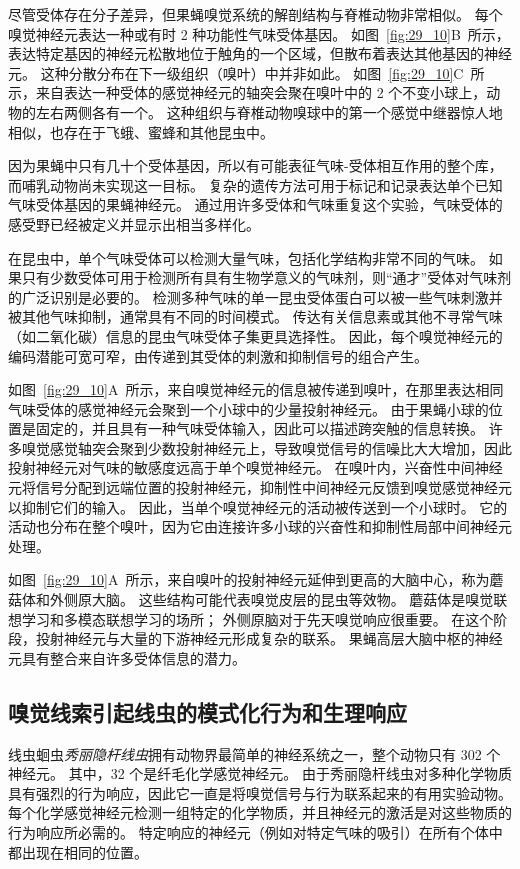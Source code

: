 尽管受体存在分子差异，但果蝇嗅觉系统的解剖结构与脊椎动物非常相似。
每个嗅觉神经元表达一种或有时 2 种功能性气味受体基因。
如图~\ref{fig:29_10}B~所示，表达特定基因的神经元松散地位于触角的一个区域，但散布着表达其他基因的神经元。
这种分散分布在下一级组织（嗅叶）中并非如此。
如图~\ref{fig:29_10}C~所示，来自表达一种受体的感觉神经元的轴突会聚在嗅叶中的 2 个不变小球上，动物的左右两侧各有一个。
这种组织与脊椎动物嗅球中的第一个感觉中继器惊人地相似，也存在于飞蛾、蜜蜂和其他昆虫中。


因为果蝇中只有几十个受体基因，所以有可能表征气味-受体相互作用的整个库，而哺乳动物尚未实现这一目标。
复杂的遗传方法可用于标记和记录表达单个已知气味受体基因的果蝇神经元。
通过用许多受体和气味重复这个实验，气味受体的感受野已经被定义并显示出相当多样化。


在昆虫中，单个气味受体可以检测大量气味，包括化学结构非常不同的气味。
如果只有少数受体可用于检测所有具有生物学意义的气味剂，则“通才”受体对气味剂的广泛识别是必要的。
检测多种气味的单一昆虫受体蛋白可以被一些气味刺激并被其他气味抑制，通常具有不同的时间模式。
传达有关信息素或其他不寻常气味（如二氧化碳）信息的昆虫气味受体子集更具选择性。
因此，每个嗅觉神经元的编码潜能可宽可窄，由传递到其受体的刺激和抑制信号的组合产生。


如图~\ref{fig:29_10}A~所示，来自嗅觉神经元的信息被传递到嗅叶，在那里表达相同气味受体的感觉神经元会聚到一个小球中的少量投射神经元。
由于果蝇小球的位置是固定的，并且具有一种气味受体输入，因此可以描述跨突触的信息转换。
许多嗅觉感觉轴突会聚到少数投射神经元上，导致嗅觉信号的信噪比大大增加，因此投射神经元对气味的敏感度远高于单个嗅觉神经元。
在嗅叶内，兴奋性中间神经元将信号分配到远端位置的投射神经元，抑制性中间神经元反馈到嗅觉感觉神经元以抑制它们的输入。
因此，当单个嗅觉神经元的活动被传送到一个小球时。
它的活动也分布在整个嗅叶，因为它由连接许多小球的兴奋性和抑制性局部中间神经元处理。


如图~\ref{fig:29_10}A~所示，来自嗅叶的投射神经元延伸到更高的大脑中心，称为蘑菇体和外侧原大脑。
这些结构可能代表嗅觉皮层的昆虫等效物。
蘑菇体是嗅觉联想学习和多模态联想学习的场所；
外侧原脑对于先天嗅觉响应很重要。
在这个阶段，投射神经元与大量的下游神经元形成复杂的联系。
果蝇高层大脑中枢的神经元具有整合来自许多受体信息的潜力。


\subsection{嗅觉线索引起线虫的模式化行为和生理响应}

线虫蛔虫\textit{秀丽隐杆线虫}拥有动物界最简单的神经系统之一，整个动物只有 302 个神经元。
其中，32 个是纤毛化学感觉神经元。
由于秀丽隐杆线虫对多种化学物质具有强烈的行为响应，因此它一直是将嗅觉信号与行为联系起来的有用实验动物。
每个化学感觉神经元检测一组特定的化学物质，并且神经元的激活是对这些物质的行为响应所必需的。
特定响应的神经元（例如对特定气味的吸引）在所有个体中都出现在相同的位置。



